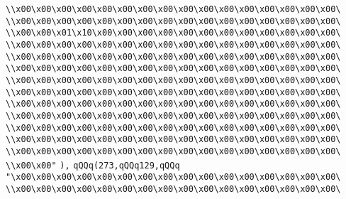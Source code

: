 \verb|\\x00\x00\x00\x00\x00\x00\x00\x00\x00\x00\x00\x00\x00\x00\x00\x00\|\newline
\verb|\\x00\x00\x00\x00\x00\x00\x00\x00\x00\x00\x00\x00\x00\x00\x00\x00\|\newline
\verb|\\x00\x00\x01\x10\x00\x00\x00\x00\x00\x00\x00\x00\x00\x00\x00\x00\|\newline
\verb|\\x00\x00\x00\x00\x00\x00\x00\x00\x00\x00\x00\x00\x00\x00\x00\x00\|\newline
\verb|\\x00\x00\x00\x00\x00\x00\x00\x00\x00\x00\x00\x00\x00\x00\x00\x00\|\newline
\verb|\\x00\x00\x00\x00\x00\x00\x00\x00\x00\x00\x00\x00\x00\x00\x00\x00\|\newline
\verb|\\x00\x00\x00\x00\x00\x00\x00\x00\x00\x00\x00\x00\x00\x00\x00\x00\|\newline
\verb|\\x00\x00\x00\x00\x00\x00\x00\x00\x00\x00\x00\x00\x00\x00\x00\x00\|\newline
\verb|\\x00\x00\x00\x00\x00\x00\x00\x00\x00\x00\x00\x00\x00\x00\x00\x00\|\newline
\verb|\\x00\x00\x00\x00\x00\x00\x00\x00\x00\x00\x00\x00\x00\x00\x00\x00\|\newline
\verb|\\x00\x00\x00\x00\x00\x00\x00\x00\x00\x00\x00\x00\x00\x00\x00\x00\|\newline
\verb|\\x00\x00\x00\x00\x00\x00\x00\x00\x00\x00\x00\x00\x00\x00\x00\x00\|\newline
\verb|\\x00\x00\x00\x00\x00\x00\x00\x00\x00\x00\x00\x00\x00\x00\x00\x00\|\newline
\verb|\\x00\x00"|\newline
\verb|),|\newline
\verb|qQQq(273,qQQq129,qQQq|\newline
\verb|"\x00\x00\x00\x00\x00\x00\x00\x00\x00\x00\x00\x00\x00\x00\x00\x00\|\newline
\verb|\\x00\x00\x00\x00\x00\x00\x00\x00\x00\x00\x00\x00\x00\x00\x00\x00\|\newline
